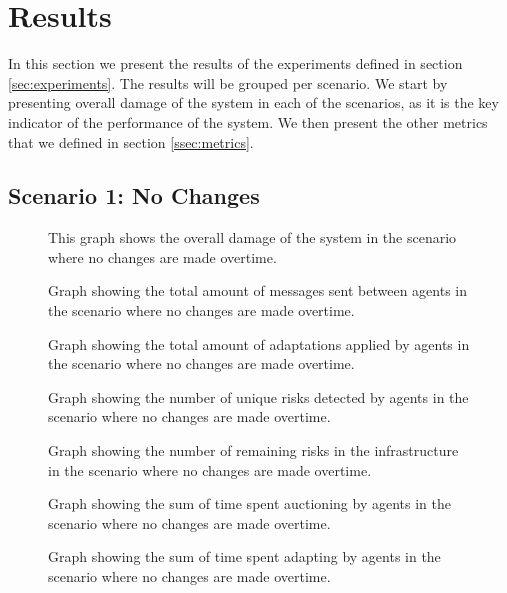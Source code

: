 \section{Results}
\label{sec:results}
In this section we present the results of the experiments defined in section \ref{sec:experiments}. The results will be grouped per scenario. We start by presenting overall damage of the system in each of the scenarios, as it is the key indicator of the performance of the system. We then present the other metrics that we defined in section \ref{ssec:metrics}.

\subsection{Scenario 1: No Changes}
\begin{figure}[H]
    \centering
    
    \caption{This graph shows the overall damage of the system in the scenario where no changes are made overtime.}
    \label{fig:overall-damage-no-change}
\end{figure}
\begin{figure}[H]
    \centering
    
    \caption{Graph showing the total amount of messages sent between agents in the scenario where no changes are made overtime.}
\end{figure}
\begin{figure}[H]
    \centering
    
    \caption{Graph showing the total amount of adaptations applied by agents in the scenario where no changes are made overtime.}
\end{figure}
\begin{figure}[H]
    \centering
        
    \caption{Graph showing the number of unique risks detected by agents in the scenario where no changes are made overtime.}
\end{figure}
\begin{figure}[H]
    \centering
        
    \caption{Graph showing the number of remaining risks in the infrastructure in the scenario where no changes are made overtime.}
\end{figure}
\begin{figure}[H]
    \centering
        
    \caption{Graph showing the sum of time spent auctioning by agents in the scenario where no changes are made overtime.}
\end{figure}
\begin{figure}[H]
    \centering
        
    \caption{Graph showing the sum of time spent adapting by agents in the scenario where no changes are made overtime.}
\end{figure}


